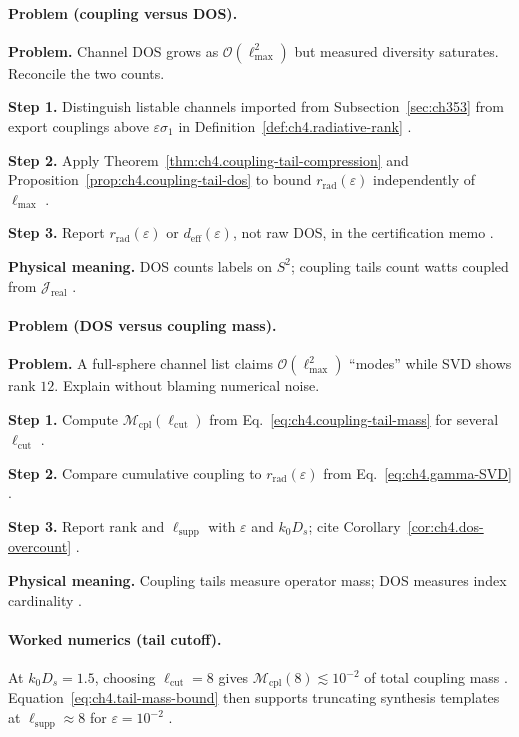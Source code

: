 \paragraph{Problem (coupling versus DOS).}
\textbf{Problem.} Channel DOS grows as \(\mathcal{O}(\ell_{\max}^{2})\) but measured diversity saturates. Reconcile the two counts.

\textbf{Step 1.} Distinguish listable channels imported from Subsection~\ref{sec:ch353} from export couplings above
\(\varepsilon\sigma_{1}\) in Definition~\ref{def:ch4.radiative-rank} \cite{hansen1988,stratton1941,harrington2001}.

\textbf{Step 2.} Apply Theorem~\ref{thm:ch4.coupling-tail-compression} and Proposition~\ref{prop:ch4.coupling-tail-dos} to bound
\(r_{\mathrm{rad}}(\varepsilon)\) independently of \(\ell_{\max}\) \cite{devaney2004,hansen1988,jackson1999}.

\textbf{Step 3.} Report \(r_{\mathrm{rad}}(\varepsilon)\) or \(d_{\mathrm{eff}}(\varepsilon)\), not raw DOS, in the certification memo
\cite{stratton1941,collin2001}.

\textbf{Physical meaning.} DOS counts labels on \(S^{2}\); coupling tails count watts coupled from \(\mathcal{J}_{\mathrm{real}}\)
\cite{hansen1988,harrington2001}.

\paragraph{Problem (DOS versus coupling mass).}
\textbf{Problem.} A full-sphere channel list claims \(\mathcal{O}(\ell_{\max}^{2})\) ``modes'' while SVD shows rank \(12\). Explain without
blaming numerical noise.

\textbf{Step 1.} Compute \(\mathcal{M}_{\mathrm{cpl}}(\ell_{\mathrm{cut}})\) from Eq.~\eqref{eq:ch4.coupling-tail-mass} for several
\(\ell_{\mathrm{cut}}\) \cite{hansen1988,harrington2001}.

\textbf{Step 2.} Compare cumulative coupling to \(r_{\mathrm{rad}}(\varepsilon)\) from Eq.~\eqref{eq:ch4.gamma-SVD}
\cite{devaney2004,stratton1941,jackson1999}.

\textbf{Step 3.} Report rank and \(\ell_{\mathrm{supp}}\) with \(\varepsilon\) and \(k_{0}D_{s}\); cite Corollary~\ref{cor:ch4.dos-overcount}
\cite{hansen1988,collin2001}.

\textbf{Physical meaning.} Coupling tails measure operator mass; DOS measures index cardinality \cite{stratton1941,devaney2004}.

\paragraph{Worked numerics (tail cutoff).}
At \(k_{0}D_{s}=1.5\), choosing \(\ell_{\mathrm{cut}}=8\) gives \(\mathcal{M}_{\mathrm{cpl}}(8)\lesssim10^{-2}\) of total coupling mass
\cite{hansen1988,harrington2001,jackson1999}. Equation~\eqref{eq:ch4.tail-mass-bound} then supports truncating synthesis templates at
\(\ell_{\mathrm{supp}}\approx8\) for \(\varepsilon=10^{-2}\) \cite{devaney2004,stratton1941,collin2001}.

